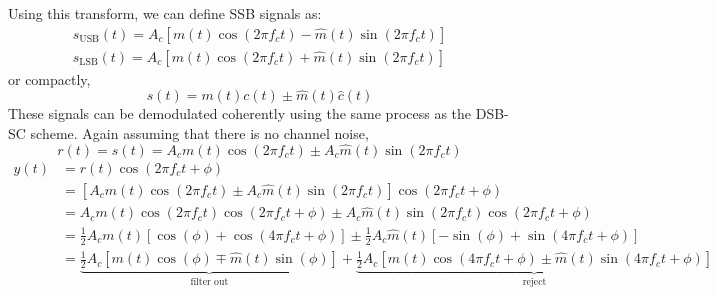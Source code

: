 \documentclass{article}
\begin{document}
Using this transform, we can define SSB signals as:
\begin{gather*}
    s_{\mathrm{USB}}\left( t \right) = A_c \left[ m\left( t \right) \cos{\left( 2 \pi f_c t \right)} - \hat{m}\left( t \right) \sin{\left( 2 \pi f_c t \right)} \right] \\
    s_{\mathrm{LSB}}\left( t \right) = A_c \left[ m\left( t \right) \cos{\left( 2 \pi f_c t \right)} + \hat{m}\left( t \right) \sin{\left( 2 \pi f_c t \right)} \right]
\end{gather*}
or compactly,
\begin{equation*}
    s\left( t \right) = m\left( t \right) c\left( t \right) \pm \hat{m}\left( t \right) \hat{c}\left( t \right)
\end{equation*}
These signals can be demodulated coherently using the same process as the DSB-SC scheme.
Again assuming that there is no channel noise,
\begin{equation*}
    r\left( t \right) = s\left( t \right) = A_c m\left( t \right) \cos{\left( 2\pi f_c t \right)} \pm A_c \hat{m}\left( t \right) \sin{\left( 2\pi f_c t \right)}
\end{equation*}
\begin{align*}
    y\left( t \right) & = r\left( t \right) \cos{\left( 2 \pi f_c t + \phi \right)}                                                                                                                                                                                                                                                                                                     \\
                      & = \left[ A_c m\left( t \right) \cos{\left( 2\pi f_c t \right)} \pm A_c \hat{m}\left( t \right) \sin{\left( 2\pi f_c t \right)} \right] \cos{\left( 2 \pi f_c t + \phi \right)}                                                                                                                                                                                  \\
                      & = A_c m\left( t \right) \cos{\left( 2\pi f_c t \right)} \cos{\left( 2 \pi f_c t + \phi \right)} \pm A_c \hat{m}\left( t \right) \sin{\left( 2\pi f_c t \right)} \cos{\left( 2 \pi f_c t + \phi \right)}                                                                                                                                                         \\
                      & = \frac{1}{2} A_c m\left( t \right) \left[ \cos{\left( \phi \right)} + \cos{\left( 4 \pi f_c t + \phi \right)} \right] \pm \frac{1}{2} A_c \hat{m}\left( t \right) \left[ -\sin{\left( \phi \right)} + \sin{\left( 4 \pi f_c t + \phi \right)} \right]                                                                                                          \\
                      & = \underbrace{\frac{1}{2} A_c \left[ m\left( t \right) \cos{\left( \phi \right)} \mp \hat{m}\left( t \right) \sin{\left( \phi \right)} \right]}_{\text{filter out}} + \underbrace{\frac{1}{2} A_c \left[ m\left( t \right) \cos{\left( 4 \pi f_c t + \phi \right)} \pm \hat{m}\left( t \right) \sin{\left( 4 \pi f_c t + \phi \right)} \right]}_{\text{reject}}
\end{align*}
\end{document}
